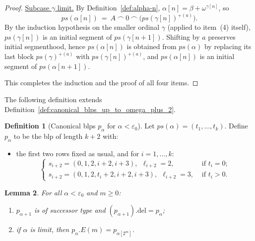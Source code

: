 \documentclass{article}
\newtheorem{lemma}{Lemma}[section]
\theoremstyle{definition}
\newtheorem{definition}[lemma]{Definition}
\theoremstyle{remark}
\begin{document}
\begin{proof}
\underline{Subcase \(\gamma\) limit.} 
By Definition~\ref{def:alpha-n}, $\alpha[n]=\beta+\omega^{\gamma[n]}$, so
\[
ps(\alpha[n])\ =\ A\ \frown\ 0\ \frown\ \bigl(ps(\gamma[n])^{+(a)}\bigr).
\]
By the induction hypothesis on the smaller ordinal $\gamma$ (applied to item~(4) itself), $ps(\gamma[n])$ is an initial segment of $ps(\gamma[n+1])$. 
Shifting by $a$ preserves initial segmenthood, hence $ps(\alpha[n])$ is obtained from $ps(\alpha)$ by replacing its last block $ps(\gamma)^{+(a)}$ with $ps(\gamma[n])^{+(a)}$, and $ps(\alpha[n])$ is an initial segment of $ps(\alpha[n+1])$.

\medskip
This completes the induction and the proof of all four items.
\end{proof}


The following definition extends Definition~\ref{def:canonical_blps_up_to_omega_plus_2}. 

\begin{definition}[Canonical blps $p_\alpha$ for $\alpha<\varepsilon_0$]\label{def:palpha}
Let $ps(\alpha)=(t_1,\ldots,t_k)$. Define $p_\alpha$ to be the blp of length $k+2$ with:
\begin{itemize}
  \item the first two rows fixed as usual, and for $i=1,\ldots,k$:
  \[
  \begin{cases}
  s_{i+2}=(0,1,2,i+2,i+3),\ \ \ell_{i+2}=2,&\text{ if }t_i=0;\\[2pt]
  s_{i+2}=(0,1,2,t_i+2,i+2,i+3),\ \ \ell_{i+2}=3,&\text{ if }t_i>0.
  \end{cases}
  \]
\end{itemize}
\end{definition}

\begin{lemma}\label{lem:palpha-successor-limit}
For all $\alpha<\varepsilon_0$ and $m\ge 0$:
\begin{enumerate}
  \item $p_{\alpha+1}$ is of successor type and $(p_{\alpha+1}).{\mathrm{del}}=p_\alpha$;
  \item if $\alpha$ is limit, then $p_\alpha.E(m)=p_{\alpha[2^m]}$.
\end{enumerate}
\end{lemma}
\end{document}
